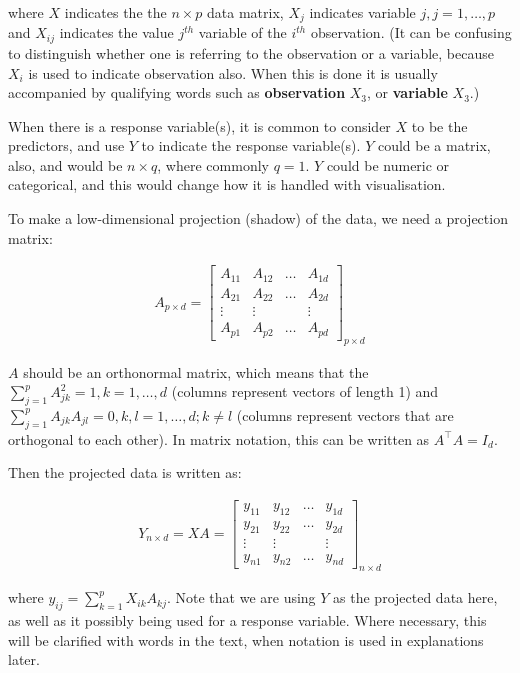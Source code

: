 \documentclass[
  letterpaper,
]{book}
\begin{document}
where \(X\) indicates the the \(n\times p\) data matrix, \(X_j\)
indicates variable \(j, j=1, \dots, p\) and \(X_{ij}\) indicates the
value \(j^{th}\) variable of the \(i^{th}\) observation. (It can be
confusing to distinguish whether one is referring to the observation or
a variable, because \(X_i\) is used to indicate observation also. When
this is done it is usually accompanied by qualifying words such as
\textbf{observation} \(X_3\), or \textbf{variable} \(X_3\).)

When there is a response variable(s), it is common to consider \(X\) to
be the predictors, and use \(Y\) to indicate the response variable(s).
\(Y\) could be a matrix, also, and would be \(n\times q\), where
commonly \(q=1\). \(Y\) could be numeric or categorical, and this would
change how it is handled with visualisation.

To make a low-dimensional projection (shadow) of the data, we need a
projection matrix:

\begin{eqnarray*}
A_{p\times d} = \left[ \begin{array}{cccc}
A_{11} & A_{12} & \dots & A_{1d} \\
A_{21} & A_{22} & \dots & A_{2d}\\
\vdots & \vdots &  & \vdots \\
A_{p1} & A_{p2} & \dots & A_{pd} \end{array} \right]_{p\times d}
\end{eqnarray*}

\(A\) should be an orthonormal matrix, which means that the
\(\sum_{j=1}^p A_{jk}^2=1, k=1, \dots, d\) (columns represent vectors of
length 1) and \(\sum_{j=1}^p A_{jk}A_{jl}=0, k,l=1, \dots, d; k\neq l\)
(columns represent vectors that are orthogonal to each other). In matrix
notation, this can be written as \(A^{\top}A = I_d\).

Then the projected data is written as:

\begin{eqnarray*}
Y_{n\times d} = XA = \left[ \begin{array}{cccc}
y_{11} & y_{12} & \dots & y_{1d} \\
y_{21} & y_{22} & \dots & y_{2d}\\
\vdots & \vdots &  & \vdots \\
y_{n1} & y_{n2} & \dots & y_{nd} \end{array} \right]_{n\times d}
\end{eqnarray*}

where \(y_{ij} = \sum_{k=1}^p X_{ik}A_{kj}\). Note that we are using
\(Y\) as the projected data here, as well as it possibly being used for
a response variable. Where necessary, this will be clarified with words
in the text, when notation is used in explanations later.
\end{document}
